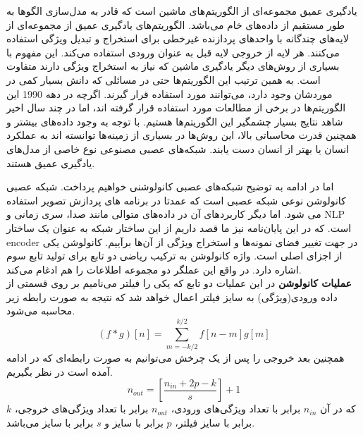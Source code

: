 
یادگیری عمیق مجموعه‌ای از الگوریتم‌های ماشین است که قادر به مدل‌سازی الگوها به طور مستقیم از داده‌های خام می‌باشد. الگوریتم‌های یادگیری عمیق از مجموعه‌ای از لایه‌های چندگانه با واحدهای پردازنده غیرخطی برای استخراج و تبدیل ویژگی استفاده می‌کنند. هر لایه از خروجی لایه قبل به عنوان ورودی استفاده می‌کند. این مفهوم با بسیاری از روش‌های دیگر یادگیری ماشین که نیاز به استخراج ویژگی دارند متفاوت است. به همین ترتیب این الگوریتم‌ها حتی در مسائلی که دانش بسیار کمی در موردشان وجود دارد، می‌توانند مورد استفاده قرار گیرند. اگرچه در دهه 1990 این الگوریتم‌ها در برخی از مطالعات مورد استفاده قرار گرفته اند، اما در چند سال اخیر شاهد نتایج بسیار چشمگیر این الگوریتم‌ها هستیم. با توجه به وجود داده‌های بیشتر و همچنین قدرت محاسباتی بالا، این روش‌ها در بسیاری از زمینه‌ها توانسته اند به عملکرد انسان یا بهتر از انسان دست یابند\cite{akselrod2017deep}. شبکه‌های عصبی مصنوعی نوع خاصی از مدل‌های یادگیری عمیق هستند.

اما در ادامه به توضیح شبکه‌های عصبی کانولوشنی خواهیم پرداخت. شبکه عصبی کانولوشن نوعی شبکه عصبی است که عمدتا در برنامه های پردازش تصویر استفاده می شود. اما دیگر کاربردهای آن در داده‌های متوالی مانند صدا، سری زمانی و NLP است. که در این پایان‌نامه نیز ما قصد داریم از این ساختار شبکه به عنوان یک ساختار \gls{encoder} در جهت تغییر فضای نمونه‌ها و استخراج ویژگی از آن‌ها برآییم. کانولوشن یکی از اجزای اصلی  است. واژه کانولوشن به ترکیب ریاضی دو تابع برای تولید تابع سوم اشاره دارد. در واقع این عملگر  دو مجموعه اطلاعات را هم ادغام می‌کند. 
\\
\noindent
\textbf{عملیات کانولوشن}
در این عملیات دو تابع که یکی را فیلتر می‌نامیم بر روی قسمتی از داده ورودی(ویژگی) به سایز فیلتر اعمال خواهد شد که نتیجه به صورت رابطه زیر محاسبه می‌شود.
\begin{equation}
	(f*g)[n]=\sum _{m=-k/2}^{k/2}f[n-m]g[m]
\end{equation}
\noindent
همچنین بعد خروجی را پس از یک چرخش می‌توانیم به صورت رابطه‌ای که در ادامه آمده است در نظر بگیریم.
\begin{equation}
	n_{out} = \left[\frac{n_{in}+2p-k}{s}\right]+1
\end{equation}
که در آن $n_{in}$ برابر با تعداد ویژگی‌های ورودی، $n_{out}$ برابر با تعداد ویژگی‌های خروجی،‌ $k$ برابر با سایز فیلتر، $p$ برابر با سایز  و $s$ برابر با سایز  می‌باشد.

